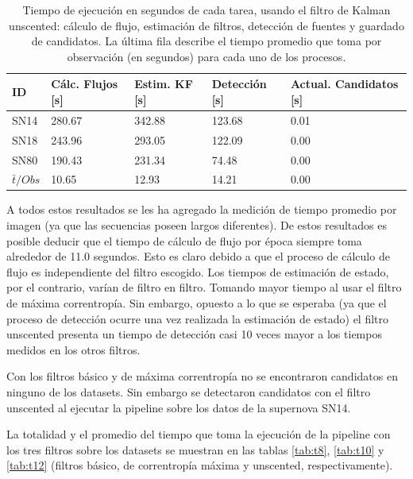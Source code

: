 \begin{table}[h!]
\centering
\caption{Tiempo de ejecuci\'on en segundos de cada tarea, usando el filtro de Kalman unscented: c\'alculo de flujo, estimaci\'on de filtros, detecci\'on de fuentes y guardado de candidatos. La \'ultima fila describe el tiempo promedio que toma por observaci\'on (en segundos) para cada uno de los procesos.}
\begin{tabular}{|l|l|l|l|l|}
\hline
\textbf{ID} & \textbf{C\'alc. Flujos [s]} & \textbf{Estim. KF [s]} &  \textbf{Detecci\'on [s]}  & \textbf{Actual. Candidatos [s]}\\ \hline \hline
SN14        & 280.67            & 342.88        &  123.68 & 0.01 \\ \hline
SN18            & 243.96             & 293.05         &  122.09  & 0.00\\ \hline
SN80            & 190.43             & 231.34         &   74.48 & 0.00 \\ \hline \hline
$\bar{t}/Obs$ & 10.65 &  12.93 & 14.21 & 0.00\\\hline 
\end{tabular}
\label{tab:t11}
\end{table}
A todos estos resultados se les ha agregado la medici\'on de tiempo promedio por imagen (ya que las secuencias poseen largos diferentes). De estos resultados es posible deducir que el tiempo de c\'alculo de flujo por \'epoca siempre toma alrededor de 11.0 segundos. Esto es claro debido a que el proceso de c\'alculo de flujo es independiente del filtro escogido. Los tiempos de estimaci\'on de estado, por el contrario, var\'ian de filtro en filtro. Tomando mayor tiempo al usar el filtro de m\'axima correntrop\'ia. Sin embargo, opuesto a lo que se esperaba (ya que el proceso de detecci\'on ocurre una vez realizada la estimaci\'on de estado) el filtro unscented presenta un tiempo de detecci\'on casi 10 veces mayor a los tiempos medidos en los otros filtros. 
\bigskip

Con los filtros b\'asico y de m\'axima correntrop\'ia no se encontraron candidatos en ninguno de los datasets. Sin embargo se detectaron candidatos con el filtro unscented al ejecutar la pipeline sobre los datos de la supernova SN14.
\bigskip

La totalidad y el promedio del tiempo que toma la ejecuci\'on de la pipeline con los tres filtros sobre los datasets se muestran en las tablas \ref{tab:t8},  \ref{tab:t10} y \ref{tab:t12} (filtros b\'asico, de correntrop\'ia m\'axima y unscented, respectivamente).
\bigskip

